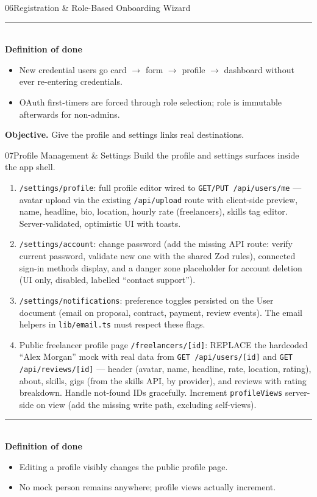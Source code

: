 \documentclass[11pt,a4paper]{article}
\newcommand{\dod}{\medskip\noindent\textcolor{donegreen}{\rule{\linewidth}{0.5pt}}\\[1mm]\textbf{\textcolor{donegreen}{Definition of done}}\\[-2mm]}
\newcommand{\objective}[1]{\noindent\textbf{Objective.} #1\medskip}
\newcommand{\filepath}[1]{\texttt{#1}}
\begin{document}
\begin{promptbox}{06}{Registration \& Role-Based Onboarding Wizard}
\dod
\begin{itemize}[leftmargin=1.6em]
  \item New credential users go card $\rightarrow$ form $\rightarrow$ profile
        $\rightarrow$ dashboard without ever re-entering credentials.
  \item OAuth first-timers are forced through role selection; role is immutable
        afterwards for non-admins.
\end{itemize}
\end{promptbox}

\objective{Give the profile and settings links real destinations.}

\begin{promptbox}{07}{Profile Management \& Settings}
Build the profile and settings surfaces inside the app shell.

\begin{enumerate}[leftmargin=1.6em]
  \item \texttt{/settings/profile}: full profile editor wired to
        \texttt{GET/PUT /api/users/me} --- avatar upload via the existing
        \texttt{/api/upload} route with client-side preview, name, headline, bio,
        location, hourly rate (freelancers), skills tag editor. Server-validated,
        optimistic UI with toasts.
  \item \texttt{/settings/account}: change password (add the missing API route:
        verify current password, validate new one with the shared Zod rules),
        connected sign-in methods display, and a danger zone placeholder for account
        deletion (UI only, disabled, labelled ``contact support'').
  \item \texttt{/settings/notifications}: preference toggles persisted on the User
        document (email on proposal, contract, payment, review events). The email
        helpers in \filepath{lib/email.ts} must respect these flags.
  \item Public freelancer profile page \texttt{/freelancers/[id]}: REPLACE the
        hardcoded ``Alex Morgan'' mock with real data from
        \texttt{GET /api/users/[id]} and \texttt{GET /api/reviews/[id]} --- header
        (avatar, name, headline, rate, location, rating), about, skills, gigs
        (from the skills API, by provider), and reviews with rating breakdown. Handle
        not-found IDs gracefully. Increment \texttt{profileViews} server-side on
        view (add the missing write path, excluding self-views).
\end{enumerate}

\dod
\begin{itemize}[leftmargin=1.6em]
  \item Editing a profile visibly changes the public profile page.
  \item No mock person remains anywhere; profile views actually increment.
\end{itemize}
\end{promptbox}
\end{document}
